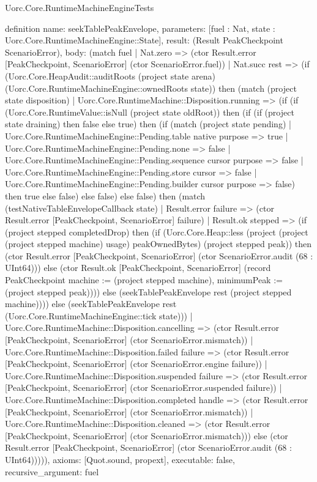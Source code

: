 \begin{lexlean}{Uorc.Core.RuntimeMachineEngineTests}
\begin{semanticmodule}
definition{
  name: seekTablePeakEnvelope,
  parameters: [fuel : Nat, state : Uorc.Core.RuntimeMachineEngine::State],
  result: (Result PeakCheckpoint ScenarioError),
  body: (match fuel
    | Nat.zero => (ctor Result.error [PeakCheckpoint, ScenarioError] (ctor ScenarioError.fuel))
    | Nat.succ rest => (if (Uorc.Core.HeapAudit::auditRoots (project state arena) (Uorc.Core.RuntimeMachineEngine::ownedRoots state)) then (match (project state disposition)
      | Uorc.Core.RuntimeMachine::Disposition.running => (if (if (Uorc.Core.RuntimeValue::isNull (project state oldRoot)) then (if (if (project state draining) then false else true) then (if (match (project state pending)
        | Uorc.Core.RuntimeMachineEngine::Pending.table native purpose => true
        | Uorc.Core.RuntimeMachineEngine::Pending.none => false
        | Uorc.Core.RuntimeMachineEngine::Pending.sequence cursor purpose => false
        | Uorc.Core.RuntimeMachineEngine::Pending.store cursor => false
        | Uorc.Core.RuntimeMachineEngine::Pending.builder cursor purpose => false) then true else false) else false) else false) then (match (testNativeTableEnvelopeCallback state)
        | Result.error failure => (ctor Result.error [PeakCheckpoint, ScenarioError] failure)
        | Result.ok stepped => (if (project stepped completedDrop) then (if (Uorc.Core.Heap::less (project (project (project stepped machine) usage) peakOwnedBytes) (project stepped peak)) then (ctor Result.error [PeakCheckpoint, ScenarioError] (ctor ScenarioError.audit (68 : UInt64))) else (ctor Result.ok [PeakCheckpoint, ScenarioError] (record PeakCheckpoint {machine := (project stepped machine), minimumPeak := (project stepped peak)}))) else (seekTablePeakEnvelope rest (project stepped machine)))) else (seekTablePeakEnvelope rest (Uorc.Core.RuntimeMachineEngine::tick state)))
      | Uorc.Core.RuntimeMachine::Disposition.cancelling => (ctor Result.error [PeakCheckpoint, ScenarioError] (ctor ScenarioError.mismatch))
      | Uorc.Core.RuntimeMachine::Disposition.failed failure => (ctor Result.error [PeakCheckpoint, ScenarioError] (ctor ScenarioError.engine failure))
      | Uorc.Core.RuntimeMachine::Disposition.suspended failure => (ctor Result.error [PeakCheckpoint, ScenarioError] (ctor ScenarioError.suspended failure))
      | Uorc.Core.RuntimeMachine::Disposition.completed handle => (ctor Result.error [PeakCheckpoint, ScenarioError] (ctor ScenarioError.mismatch))
      | Uorc.Core.RuntimeMachine::Disposition.cleaned => (ctor Result.error [PeakCheckpoint, ScenarioError] (ctor ScenarioError.mismatch))) else (ctor Result.error [PeakCheckpoint, ScenarioError] (ctor ScenarioError.audit (68 : UInt64))))),
  axioms: [Quot.sound, propext],
  executable: false,
  recursive_argument: fuel
}


\end{semanticmodule}
\end{lexlean}
